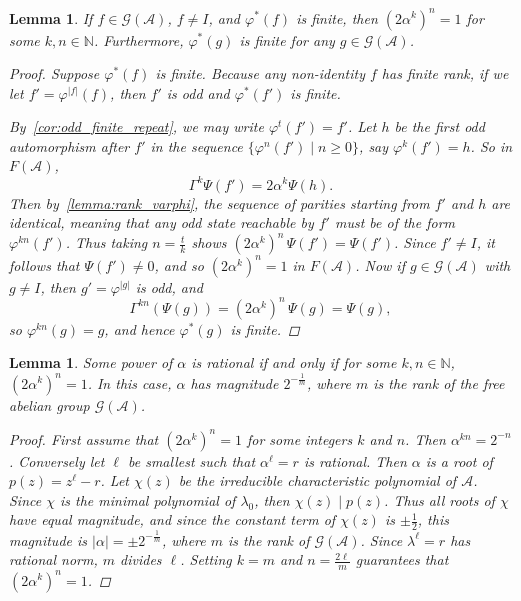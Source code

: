 \documentclass[12pt, letterpaper]{article}
\newcommand{\N}{\mathbb N}
\newcommand{\A}{\mathcal A}
\newcommand{\gp}{\mathcal G}
\newcommand{\rk}[1]{\left|#1\right|}
\newtheorem{lemma}[thm]{Lemma}
\begin{document}
\begin{lemma}\label{lemma:2alphakn_eq1}
    If $f \in \gp(\A)$, $f \ne I$, and $\varphi^*(f)$ is finite, then
    $(2 \alpha^k)^n = 1$ for some $k, n \in \N$. Furthermore, $\varphi^*(g)$ is
    finite for any $g \in \gp(\A)$.
    \begin{proof}
        Suppose $\varphi^*(f)$ is finite. Because any non-identity $f$ has
        finite rank, if we let $f' = \varphi^{\rk{f}}(f)$, then $f'$ is odd and
        $\varphi^*(f')$ is finite.

        By~\cref{cor:odd_finite_repeat}, we may write $\varphi^t(f') = f'$.
        Let $h$ be the first odd automorphism after $f'$ in the sequence
        $\{\varphi^n(f') \mid n \ge 0\}$, say $\varphi^k(f') = h$. So in
        $F(\A)$,
        \[
            \Gamma^k \Psi(f') = 2\alpha^k \Psi(h).
        \]
        Then by~\cref{lemma:rank_varphi}, the sequence of parities starting
        from $f'$ and $h$ are identical, meaning that any odd state reachable
        by $f'$ must be of the form $\varphi^{kn}(f')$. Thus taking $n =
        \frac{t}{k}$ shows $(2 \alpha^k)^n \, \Psi(f') = \Psi(f')$. Since $f'
        \ne I$, it follows that $\Psi(f') \ne 0$, and so $(2 \alpha^k)^n = 1$
        in $F(\A)$.  Now if $g \in \gp(\A)$ with $g \ne I$, then $g' =
        \varphi^{\rk{g}}$ is odd, and \[ \Gamma^{kn}(\Psi(g)) = (2\alpha^k)^n
            \, \Psi(g) = \Psi(g), \] so $\varphi^{kn}(g) = g$, and hence
        $\varphi^*(g)$ is finite.
    \end{proof}
\end{lemma}
\begin{lemma}\label{lemma:rational_nth_root}
    Some power of $\alpha$ is rational if and only if for some $k, n \in \N$,
    $(2 \alpha^k)^n = 1$. In this case, $\alpha$ has magnitude
    $2^{-\frac{1}{m}}$, where $m$ is the rank of the free abelian group
    $\gp(\A)$.
    \begin{proof}
        First assume that $(2 \alpha^k)^n = 1$ for some integers $k$ and $n$.
        Then $\alpha^{kn} = 2^{-n}$.  Conversely let $\ell$ be smallest such
        that $\alpha^{\ell} = r$ is rational. Then $\alpha$ is a root of $p(z)
        = z^\ell - r$.  Let $\chi(z)$ be the irreducible characteristic
        polynomial of $\A$.  Since $\chi$ is the minimal polynomial of
        $\lambda_0$, then $\chi(z) \mid p(z)$. Thus all roots of $\chi$ have
        equal magnitude, and since the constant term of $\chi(z)$ is $\pm
        \frac{1}{2}$, this magnitude is $|\alpha| = \pm 2^{-\frac{1}{m}}$,
        where $m$ is the rank of $\gp(\A)$.  Since $\lambda^\ell = r$ has
        rational norm, $m$ divides $\ell$.  Setting $k = m$ and $n =
        \frac{2\ell}{m}$ guarantees that $(2\alpha^k)^n = 1$.
    \end{proof}
\end{lemma}
\end{document}
